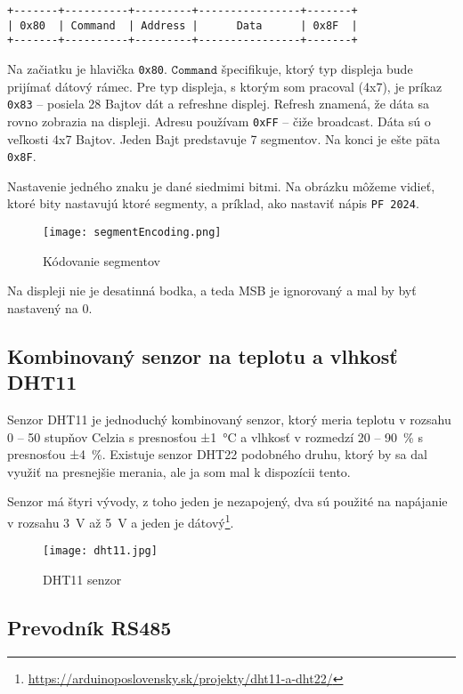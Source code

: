\documentclass[a4paper, 12pt]{article}
\begin{document}
\begin{verbatim}
+-------+----------+---------+----------------+-------+
| 0x80  | Command  | Address |      Data      | 0x8F  |
+-------+----------+---------+----------------+-------+
\end{verbatim}

Na začiatku je hlavička \texttt{0x80}. \( \texttt{Command} \) špecifikuje, ktorý typ displeja bude prijímať dátový rámec. Pre typ displeja, s ktorým som pracoval (4x7), je príkaz \texttt{0x83} – posiela 28 Bajtov dát a refreshne displej. Refresh znamená, že dáta sa rovno zobrazia na displeji. Adresu používam \texttt{0xFF} – čiže broadcast. Dáta sú o veľkosti 4x7 Bajtov. Jeden Bajt predstavuje 7 segmentov. Na konci je ešte päta \texttt{0x8F}.

Nastavenie jedného znaku je dané siedmimi bitmi. Na obrázku môžeme vidieť, ktoré bity nastavujú ktoré segmenty, a príklad, ako nastaviť nápis \texttt{PF 2024}.

\begin{figure}[H]
    \centering
    \texttt{[image: segmentEncoding.png]}
    \caption{Kódovanie segmentov}\label{fig:7seg}
\end{figure}

Na displeji nie je desatinná bodka, a teda MSB je ignorovaný a mal by byť nastavený na 0.

\subsection{Kombinovaný senzor na teplotu a vlhkosť DHT11}

Senzor DHT11 je jednoduchý kombinovaný senzor, ktorý meria teplotu v rozsahu 0 -- 50 stupňov Celzia s presnosťou ±1~°C a vlhkosť v rozmedzí 20 -- 90~\% s presnosťou ±4~\%. Existuje senzor DHT22 podobného druhu, ktorý by sa dal využiť na presnejšie merania, ale ja som mal k dispozícii tento.

Senzor má štyri vývody, z toho jeden je nezapojený, dva sú použité na napájanie v rozsahu 3~V až 5~V a jeden je dátový\footnote{\url{https://arduinoposlovensky.sk/projekty/dht11-a-dht22/}}.

\begin{figure}[H]
    \centering
    \texttt{[image: dht11.jpg]}
    \caption{DHT11 senzor}\label{fig:dht11}
\end{figure}

\subsection{Prevodník RS485}
\end{document}
